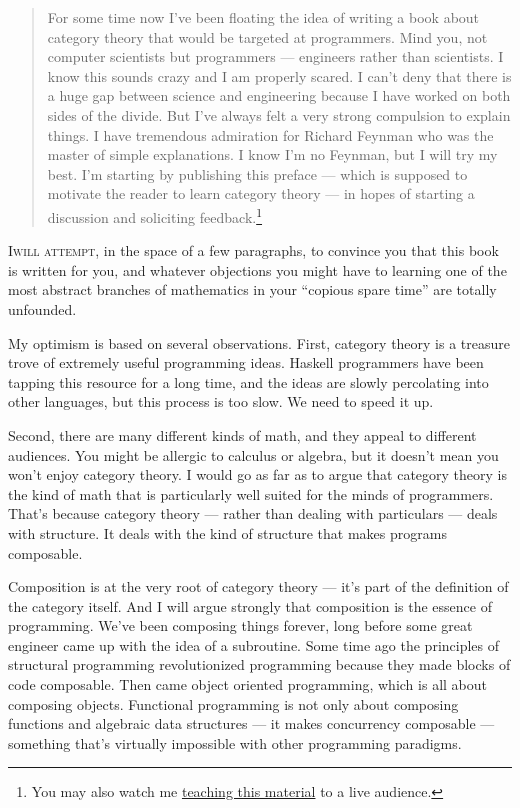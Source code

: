 \begin{quote}
For some time now I've been floating the idea of writing a book about
category theory that would be targeted at programmers. Mind you, not
computer scientists but programmers --- engineers rather than
scientists. I know this sounds crazy and I am properly scared. I can't
deny that there is a huge gap between science and engineering because I
have worked on both sides of the divide. But I've always felt a very
strong compulsion to explain things. I have tremendous admiration for
Richard Feynman who was the master of simple explanations. I know I'm no
Feynman, but I will try my best. I'm starting by publishing this preface
--- which is supposed to motivate the reader to learn category theory
--- in hopes of starting a discussion and soliciting feedback.\footnote{
    You may also watch me \href{https://www.youtube.com/playlist?list=PLbgaMIhjbmEnaH_LTkxLI7FMa2HsnawM_}{teaching
    this material} to a live audience.}
\end{quote}

\lettrine[lhang=0.17]{I}{will attempt}, in the space of a few paragraphs,
to convince you that this book is written for you, and whatever
objections you might have to learning one of the most abstract branches
of mathematics in your ``copious spare time'' are totally unfounded.

My optimism is based on several observations. First, category theory is
a treasure trove of extremely useful programming ideas. Haskell
programmers have been tapping this resource for a long time, and the
ideas are slowly percolating into other languages, but this process is
too slow. We need to speed it up.

Second, there are many different kinds of math, and they appeal to
different audiences. You might be allergic to calculus or algebra, but
it doesn't mean you won't enjoy category theory. I would go as far as
to argue that category theory is the kind of math that is particularly
well suited for the minds of programmers. That's because category theory
--- rather than dealing with particulars --- deals with structure. It
deals with the kind of structure that makes programs composable.

Composition is at the very root of category theory --- it's part of the
definition of the category itself. And I will argue strongly that
composition is the essence of programming. We've been composing things
forever, long before some great engineer came up with the idea of a
subroutine. Some time ago the principles of structural programming
revolutionized programming because they made blocks of code composable.
Then came object oriented programming, which is all about composing
objects. Functional programming is not only about composing functions
and algebraic data structures --- it makes concurrency composable ---
something that's virtually impossible with other programming paradigms.

